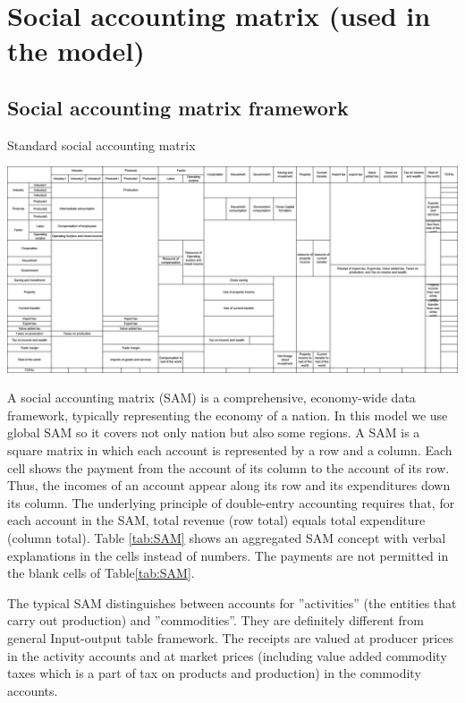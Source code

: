 \documentclass[10pt,a4paper,titlepage,dvipdfmx]{book}
\begin{document}
\chapter{\label{chp:sam}Social accounting matrix (used in the model)}

\section{\label{sec:sam}Social accounting matrix framework}


\begin{table}
\caption{\label{tab:SAM} Standard social accounting matrix}\includegraphics[width=1\textwidth]{fig/image1.png}
\end{table}

A social accounting matrix (SAM) is a comprehensive, economy-wide data framework, typically representing the economy of a nation. In this model we use global SAM so it covers not only nation but also some regions. A SAM is a square matrix in which each account is represented by a row and a column. Each cell shows the payment from the account of its column to the account of its row. Thus, the incomes of an account appear along its row and its expenditures down its column. The underlying principle of double-entry accounting requires that, for each account in the SAM, total revenue (row total) equals total expenditure (column total). Table \ref{tab:SAM} shows an aggregated SAM concept with verbal explanations in the cells instead of numbers. The payments are not permitted in the blank cells of Table{\ref{tab:SAM}}.


The typical SAM distinguishes between accounts for ''activities'' (the entities that carry out production) and ''commodities''. They are definitely different from general Input-output table framework. The receipts are valued at producer prices in the activity accounts and at market prices (including value added commodity taxes which is a part of tax on products and production) in the commodity accounts. 
\end{document}
